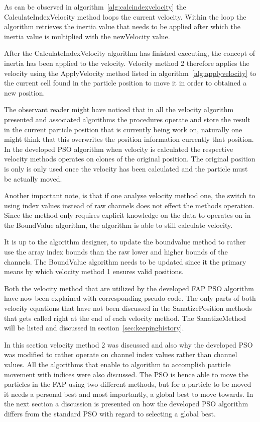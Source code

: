 As can be observed in algorithm~\ref{alg:calcindexvelocity} the CalculateIndexVelocity method loops the current velocity. Within the loop the algorithm retrieves the inertia value that needs to be applied after which the inertia value is multiplied with the newVelocity value.

After the CalculateIndexVelocity algorithm has finished executing, the concept of inertia has been applied to the velocity. Velocity method 2 therefore applies the velocity using the ApplyVelocity method listed in algorithm~\ref{alg:applyvelocity} to the current cell found in the particle position to move it in order to obtained a new position.

The observant reader might have noticed that in all the velocity algorithm presented and associated algorithms the procedures operate and store the result in the current particle position that is currently being work on, naturally one might think that this overwrites the position information currently that position. In the developed PSO algorithm when velocity is calculated the respective velocity methods operates on clones of the original position. The original position is only is only used once the velocity has been calculated and the particle must be actually moved.

Another important note, is that if one analyse velocity method one, the switch to using index values instead of raw channels does not effect the methods operation. Since the method only requires explicit knowledge on the data to operates on in the BoundValue algorithm, the algorithm is able to still calculate velocity. 

It is up to the algorithm designer, to update the boundvalue method to rather use the array index bounds than the raw lower and higher bounds of the channels. The BoundValue algorithm needs to be updated since it the primary means by which velocity method 1 ensures valid positions.

Both the velocity method that are utilized by the developed FAP PSO algorithm have now been explained with corresponding pseudo code. The only parts of both velocity equations that have not been discussed in the SanatizePosition methods that gets called right at the end of each velocity method. The SanatizeMethod will be listed and discussed in section~\ref{sec:keepinghistory}.

In this section velocity method 2 was discussed and also why the developed PSO was modified to rather operate on channel index values rather than channel values. All the algorithms that enable to algorithm to accomplish particle movement with indices were also discussed. The PSO is hence able to move the particles in the FAP using two different methods, but for a particle to be moved it needs a personal best and most importantly, a global best to move towards. In the next section a discussion is presented on how the developed PSO algorithm differs from the standard PSO with regard to selecting a global best.
